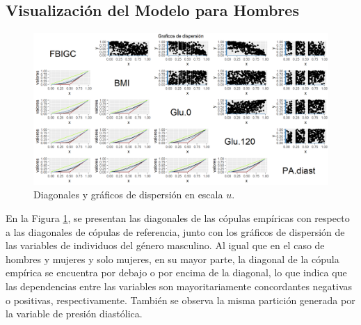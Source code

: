 \begin{landscape}
\subsection{Visualización del Modelo para Hombres}

\begin{figure}[H]
    \centering
    \includegraphics[height = 13.5 cm, width = 1.4 \textwidth]{4img/UdiagH.png}
    \caption{Diagonales y gráficos de dispersión en escala $u$.}
    \label{fig:diagHo}
\end{figure}
\end{landscape}

En la Figura \ref{fig:diagHo}, se presentan las diagonales de las cópulas empíricas con respecto a las diagonales de cópulas de referencia, junto con los gráficos de dispersión de las variables de individuos del género masculino. Al igual que en el caso de hombres y mujeres y solo mujeres, en su mayor parte, la diagonal de la cópula empírica se encuentra por debajo o por encima de la diagonal, lo que indica que las dependencias entre las variables son mayoritariamente concordantes negativas o positivas, respectivamente. También se observa la misma partición generada por la variable de presión diastólica.

